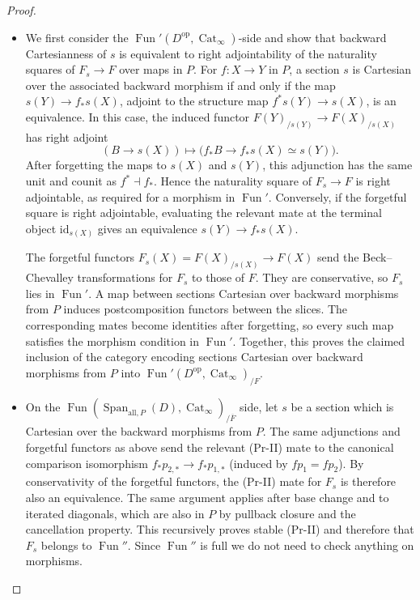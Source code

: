 \documentclass[11pt,a4paper]{article}
\theoremstyle{definition}
\newcommand{\op}{\mathrm{op}}
\newcommand{\Fun}{\operatorname{Fun}}
\newcommand{\Span}{\operatorname{Span}}
\newcommand{\id}{\mathrm{id}}
\begin{document}
\begin{proof}
\begin{itemize}
\item
We first consider the $\Fun'(D^{\op},\operatorname{Cat}_\infty)$-side and show that backward
Cartesianness of $s$ is equivalent to right adjointability of
the naturality squares of $F_s\to F$ over maps in $P$.
For $f:X\to Y$ in $P$,
a section $s$ is Cartesian over the associated backward morphism
if and only if the map $s(Y)\to f_*s(X)$, adjoint to the structure
map $f^*s(Y)\to s(X)$, is an equivalence. In this case, the induced functor
$F(Y)_{/s(Y)}\to F(X)_{/s(X)}$
has right adjoint
\[
 (B\to s(X))\longmapsto
 \bigl(f_*B\to f_*s(X)\simeq s(Y)\bigr).
\]
After forgetting the maps to $s(X)$ and $s(Y)$, this adjunction
has the same unit and counit as $f^*\dashv f_*$.
Hence the naturality square of $F_s\to F$ is right adjointable,
as required for a morphism in $\Fun'$.
Conversely, if the forgetful square is
right adjointable, evaluating the relevant mate at the terminal
object $\id_{s(X)}$ gives an equivalence $s(Y)\to f_*s(X)$.

The forgetful functors $F_s(X)=F(X)_{/s(X)}\to F(X)$ send the
Beck--Chevalley transformations for $F_s$ to those of $F$.
They are conservative, so $F_s$ lies in $\Fun'$.
A map between sections Cartesian over backward morphisms from $P$
induces postcomposition functors between the slices.
The corresponding mates become identities after
forgetting, so every such map satisfies the morphism condition
in $\Fun'$.
Together, this proves the claimed inclusion of the category
encoding sections Cartesian over backward morphisms from $P$
into $\Fun'(D^{\op},\operatorname{Cat}_\infty)_{/F}$.

\item
On the $\Fun(\Span_{\mathrm{all},P}(D),\operatorname{Cat}_\infty)_{/\overline F}$
side, let $s$ be a section which is Cartesian over the backward
morphisms from $P$.
The same adjunctions and forgetful functors as above send the relevant
(Pr-II) mate to the canonical comparison isomorphism
$f_*p_{2,*}\to f_*p_{1,*}$ (induced by 
$fp_1=fp_2$).
By conservativity of the forgetful functors, the (Pr-II)
mate for $F_s$ is therefore also an equivalence.
The same argument applies after base change and to iterated
diagonals, which are also in $P$ by pullback closure and the 
cancellation property. This recursively proves stable (Pr-II) and therefore that $F_s$ belongs to $\Fun''$.
Since $\Fun''$ is full we do not need to check anything on morphisms. 
\end{itemize}


\end{proof}
\end{document}
